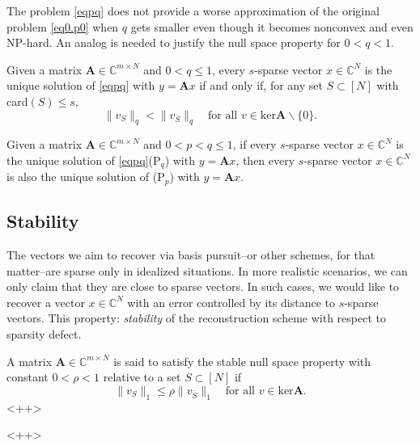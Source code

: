 The problem \cref{eqpq} does not provide a worse approximation of the original problem \cref{eq0.p0} when $q$ gets smaller even though it becomes nonconvex and even NP-hard. An analog is needed to justify the null space property for $0 < q < 1$.

\begin{theorem}
    \label{th0.4.9}
    Given a matrix $\mathbf{A} \in \mathbb{C}^{m \times N}$ and $0 <q \leq 1$, every $s$-sparse vector $x \in \mathbb{C}^N$ is the unique solution of \cref{eqpq} with $y = \mathbf{A}x$ if and only if, for any set $S\subset [N]$ with card$(S) \leq s$,
    \[
        \|v_S\|_q < \|v_{\bar{S}}\|_q \quad \text{for all }v \in \text{ker} \mathbf{A} \backslash \{0\}.
    \]
\end{theorem}

\begin{theorem}
    \label{th0.4.10}
    Given a matrix $\mathbf{A} \in \mathbb{C}^{m \times N}$ and $0 < p<q\leq1$, if every $s$-sparse vector $x \in \mathbb{C}^N$ is the unique solution of \cref{eqpq}(P$_q$) with $y = \mathbf{A}x$, then every $s$-sparse vector $x \in \mathbb{C}^N$ is also the unique solution of (P$_p$) with $y = \mathbf{A}x$.
\end{theorem}

\subsection{Stability}
The vectors we aim to recover via basis pursuit--or other schemes, for that matter--are sparse only in idealized situations. In more realistic scenarios, we can only claim that they are close to sparse vectors. In such cases, we would like to recover a vector $x \in \mathbb{C}^N$ with an error controlled by its distance to $s$-sparse vectors. This property: \emph{\textcolor[rgb]{1,0,0}{stability}} of the reconstruction scheme with respect to sparsity defect. 
\begin{definition}
    \label{def0.4.11}
    A matrix $\mathbf{A} \in \mathbb{C}^{m\times N}$ is said to satisfy the \textcolor[rgb]{1,0,0}{stable null space property} with constant $0 < \rho <1$ relative to a set $S \subset [N]$ if 
    \[
        \|v_S\|_1 \leq \rho\|v_{\bar{S}}\|_1 \quad \text{for all } v \in \text{ker}\mathbf{A}.
    \]<++>
\end{definition}<++>











